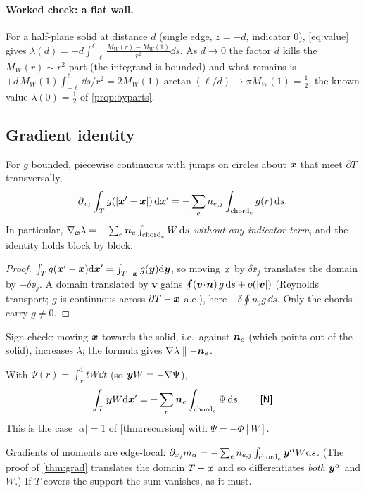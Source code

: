 \paragraph{Worked check: a flat wall.} For a half-plane solid at distance $d$ (single edge, $z=-d$, indicator $0$), \cref{eq:value} gives
$\lambda(d)=-d\int_{-\ell}^{\ell}\frac{M_W(r)-M_W(1)}{r^2}\dd s$. As $d\to0$ the factor $d$ kills the $M_W(r)\sim r^2$ part
(the integrand is bounded) and what remains is $+d\,M_W(1)\int_{-\ell}^{\ell}\dd s/r^2=2M_W(1)\arctan(\ell/d)\to\pi M_W(1)=\frac12$,
the known value $\lambda(0)=\frac12$ of \cref{prop:byparts}.

\subsection{Gradient identity}
\begin{theorem}\label{thm:grad}
For $g$ bounded, piecewise continuous with jumps on circles about $\bm x$ that meet $\partial T$ transversally,
\[
 \partial_{x_j}\int_Tg(|\bm x'-\bm x|)\,\mathrm{d}\bm x'=-\sum_e n_{e,j}\int_{\mathrm{chord}_e}g(r)\,\mathrm{d} s.
\]
In particular, $\nabla_{\bm x}\lambda=-\sum_e\bm n_e\int_{\mathrm{chord}_e}W\,\mathrm{d} s$ \emph{without any indicator term}, and the identity holds
block by block.
\end{theorem}
\begin{proof}
$\int_Tg(\bm x'-\bm x)\mathrm{d}\bm x'=\int_{T-\bm x}g(\bm y)\mathrm{d}\bm y$, so moving $\bm x$ by $\delta\ee_j$ translates the domain by $-\delta\ee_j$.
A domain translated by $\bm v$ gains $\oint(\bm v\!\cdot\!\bm n)\,g\,\mathrm{d} s+o(|\bm v|)$ (Reynolds transport; $g$ is continuous across
$\partial T-\bm x$ a.e.), here $-\delta\oint n_jg\,\dd s$. Only the chords carry $g\neq0$.
\end{proof}
Sign check: moving $\bm x$ towards the solid, i.e.\ against $\bm n_e$ (which points out of the solid), increases $\lambda$; the formula gives $\nabla\lambda\parallel-\bm n_e$.
\begin{corollary}\label{cor:firstmoment}
With $\Psi(r)=\int_r^1tW\dd t$ (so $\bm y W=-\nabla\Psi$),
\[
 \int_T\yy W\dd\xx'=-\sum_e\nn_e\int_{\chord_e}\Psi\,\dd s. \qquad\status{N}
\]
This is the case $|\alpha|=1$ of \cref{thm:recursion} with $\Psi=-\Phi[W]$.
\end{corollary}
\begin{corollary}\label{cor:fullspace}
Gradients of moments are edge-local:
$\partial_{x_j}m_\alpha=-\sum_en_{e,j}\int_{\mathrm{chord}_e}\bm y^\alpha W\mathrm{d} s$. (The proof of \cref{thm:grad} translates the domain $T-\bm x$
and so differentiates \emph{both} $\bm y^\alpha$ and $W$.) If $T$ covers the support the sum
vanishes, as it must.
\end{corollary}

